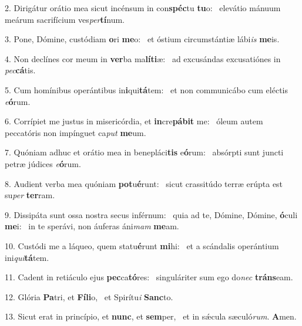 2. Dirigátur orátio mea sicut incénsum in con\textbf{spéc}tu \textbf{tu}o: \ast\  elevátio mánuum meárum sacrifícium ves\textit{per}\textbf{tí}num.\

3. Pone, Dómine, custódiam \textbf{o}ri \textbf{me}o: \ast\  et óstium circumstántiæ lábi\textit{is} \textbf{me}is.\

4. Non declínes cor meum in \textbf{ver}ba ma\textbf{lí}\textbf{ti}æ: \ast\  ad excusándas excusatiónes in \textit{pec}\textbf{cá}tis.\

5. Cum homínibus operántibus in\textbf{i}qui\textbf{tá}tem: \ast\  et non communicábo cum eléctis \textit{e}\textbf{ó}rum.\

6. Corrípiet me justus in misericórdia, et \textbf{in}cre\textbf{pá}\textbf{bit} me: \ast\  óleum autem peccatóris non impínguet ca\textit{put} \textbf{me}um.\

7. Quóniam adhuc et orátio mea in benepláci\textbf{tis} e\textbf{ó}rum: \ast\  absórpti sunt juncti petræ júdices \textit{e}\textbf{ó}rum.\

8. Audient verba mea quóniam \textbf{pot}u\textbf{é}runt: \ast\  sicut crassitúdo terræ erúpta est su\textit{per} \textbf{ter}ram.\

9. Dissipáta sunt ossa nostra secus inférnum: \dag\  quia ad te, Dómine, Dómine, \textbf{ó}culi \textbf{me}i: \ast\  in te sperávi, non áuferas áni\textit{mam} \textbf{me}am.\

10. Custódi me a láqueo, quem statu\textbf{é}runt \textbf{mi}hi: \ast\  et a scándalis operántium ini\textit{qui}\textbf{tá}tem.\

11. Cadent in retiáculo ejus \textbf{pec}ca\textbf{tó}res: \ast\  singuláriter sum ego do\textit{nec} \textbf{tráns}eam.\

12. Glória \textbf{Pa}tri, et \textbf{Fí}\textbf{li}o, \ast\  et Spirítu\textit{i} \textbf{Sanc}to.\

13. Sicut erat in princípio, et \textbf{nunc}, et \textbf{sem}per, \ast\  et in sǽcula sæculó\textit{rum}. \textbf{A}men.\


